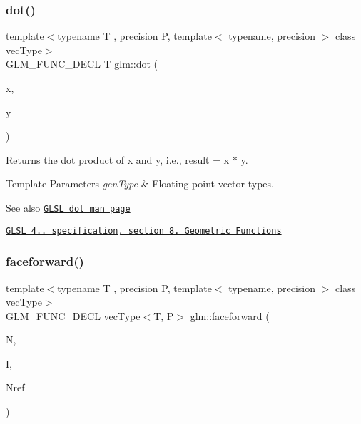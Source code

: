 \subsubsection{\texorpdfstring{dot()}{dot()}}
{\footnotesize\ttfamily template$<$typename T , precision P, template$<$ typename, precision $>$ class vec\+Type$>$ \\
G\+L\+M\+\_\+\+F\+U\+N\+C\+\_\+\+D\+E\+CL T glm\+::dot (\begin{DoxyParamCaption}\item[{vec\+Type$<$ T, P $>$ const \&}]{x,  }\item[{vec\+Type$<$ T, P $>$ const \&}]{y }\end{DoxyParamCaption})}

Returns the dot product of x and y, i.\+e., result = x $\ast$ y.


\begin{DoxyTemplParams}{Template Parameters}
{\em gen\+Type} & Floating-\/point vector types.\\
\hline
\end{DoxyTemplParams}
\begin{DoxySeeAlso}{See also}
\href{http://www.opengl.org/sdk/docs/manglsl/xhtml/dot.xml}{\tt G\+L\+SL dot man page} 

\href{http://www.opengl.org/registry/doc/GLSLangSpec.4.20.8.pdf}{\tt G\+L\+SL 4.. specification, section 8. Geometric Functions} 
\end{DoxySeeAlso}
\mbox{\label{group__core__func__geometric_gaea854e5aec1b5839832ac2dfc7cd3c0d}} 
\subsubsection{\texorpdfstring{faceforward()}{faceforward()}}
{\footnotesize\ttfamily template$<$typename T , precision P, template$<$ typename, precision $>$ class vec\+Type$>$ \\
G\+L\+M\+\_\+\+F\+U\+N\+C\+\_\+\+D\+E\+CL vec\+Type$<$T, P$>$ glm\+::faceforward (\begin{DoxyParamCaption}\item[{vec\+Type$<$ T, P $>$ const \&}]{N,  }\item[{vec\+Type$<$ T, P $>$ const \&}]{I,  }\item[{vec\+Type$<$ T, P $>$ const \&}]{Nref }\end{DoxyParamCaption})}

